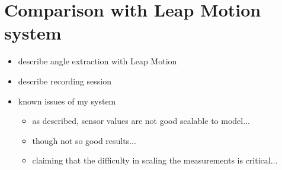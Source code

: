\lhead[\chaptername~\thechapter]{\rightmark}

\rhead[\leftmark]{}

\lfoot[\thepage]{}

\cfoot{}

\rfoot[]{\thepage}

\chapter{Comparison with Leap Motion system}

\begin{itemize}
\item describe angle extraction with Leap Motion
\item describe recording session
\item known issues of my system
\begin{itemize}
\item as described, sensor values are not good scalable to model...
\item though not so good results...
\item claiming that the difficulty in scaling the measurements is critical...
\end{itemize}
\end{itemize}